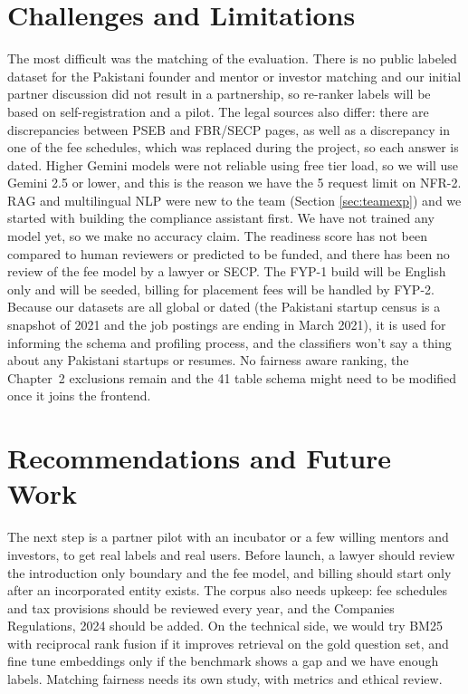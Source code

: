 \documentclass{FastFyp}
\begin{document}
\section{Challenges and Limitations}
The most difficult was the matching of the evaluation. There is no public labeled dataset for the Pakistani founder and mentor or investor matching and our initial partner discussion did not result in a partnership, so re-ranker labels will be based on self-registration and a pilot. The legal sources also differ: there are discrepancies between PSEB and FBR/SECP pages, as well as a discrepancy in one of the fee schedules, which was replaced during the project, so each answer is dated. Higher Gemini models were not reliable using free tier load, so we will use Gemini 2.5 or lower, and this is the reason we have the 5 request limit on NFR-2. RAG and multilingual NLP were new to the team (Section \ref{sec:teamexp}) and we started with building the compliance assistant first. We have not trained any model yet, so we make no accuracy claim. The readiness score has not been compared to human reviewers or predicted to be funded, and there has been no review of the fee model by a lawyer or SECP. The FYP-1 build will be English only and will be seeded, billing for placement fees will be handled by FYP-2. Because our datasets are all global or dated (the Pakistani startup census is a snapshot of 2021 and the job postings are ending in March 2021), it is used for informing the schema and profiling process, and the classifiers won't say a thing about any Pakistani startups or resumes. No fairness aware ranking, the Chapter~2 exclusions remain and the 41 table schema might need to be modified once it joins the frontend.

\section{Recommendations and Future Work}

The next step is a partner pilot with an incubator or a few willing mentors and investors, to get real labels and real users. Before launch, a lawyer should review the introduction only boundary and the fee model, and billing should start only after an incorporated entity exists. The corpus also needs upkeep: fee schedules and tax provisions should be reviewed every year, and the Companies Regulations, 2024 should be added. On the technical side, we would try BM25 with reciprocal rank fusion if it improves retrieval on the gold question set, and fine tune embeddings only if the benchmark shows a gap and we have enough labels. Matching fairness needs its own study, with metrics and ethical review.
\end{document}
